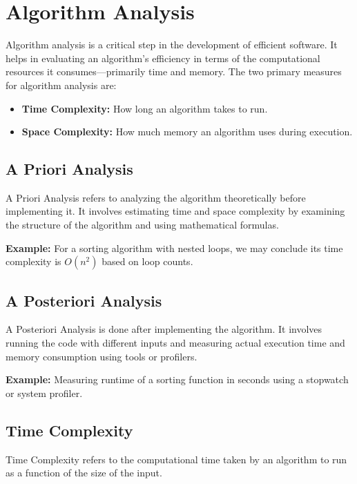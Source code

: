 \section*{\Large \textbf{Algorithm Analysis}}

Algorithm analysis is a critical step in the development of efficient software. It helps in evaluating an algorithm’s efficiency in terms of the computational resources it consumes—primarily time and memory. The two primary measures for algorithm analysis are:

\begin{itemize}
  \item \textbf{Time Complexity:} How long an algorithm takes to run.
  \item \textbf{Space Complexity:} How much memory an algorithm uses during execution.
\end{itemize}

\subsection*{\large \textbf{A Priori Analysis}}

A Priori Analysis refers to analyzing the algorithm theoretically before implementing it. It involves estimating time and space complexity by examining the structure of the algorithm and using mathematical formulas.

\textbf{Example:} For a sorting algorithm with nested loops, we may conclude its time complexity is $O(n^2)$ based on loop counts.

\subsection*{\large \textbf{A Posteriori Analysis}}

A Posteriori Analysis is done after implementing the algorithm. It involves running the code with different inputs and measuring actual execution time and memory consumption using tools or profilers.

\textbf{Example:} Measuring runtime of a sorting function in seconds using a stopwatch or system profiler.

\subsection*{\large \textbf{Time Complexity}}

Time Complexity refers to the computational time taken by an algorithm to run as a function of the size of the input.

